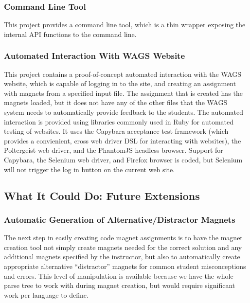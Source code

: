 \documentclass[letter,10pt]{article}
\begin{document}
\subsubsection{Command Line Tool}

This project provides a command line tool, which is a thin wrapper 
exposing the internal API functions to the command line.


\subsubsection{Automated Interaction With WAGS Website}

This project contains a proof-of-concept automated interaction with the 
WAGS website, which is capable of logging in to the site, and creating 
an assignment with magnets from a specified input file. The assignment 
that is created has the magnets loaded, but it does not have any of the 
other files that the WAGS system needs to automatically provide 
feedback to the students. The automated interaction is provided using 
libraries commonly used in Ruby for automated testing of websites. It 
uses the Capybara acceptance test framework (which provides a 
convienient, cross web driver DSL for interacting with websites), the 
Poltergeist web driver, and the PhantomJS headless browser. Support for 
Capybara, the Selenium web driver, and Firefox browser is coded, but 
Selenium will not trigger the log in button on the current web site.


\subsection{What It Could Do: Future Extensions}

\subsubsection{Automatic Generation of Alternative/Distractor Magnets}

The next step in easily creating code magnet assignments is to have the 
magnet creation tool not simply create magnets needed for the correct 
solution and any additional magnets specified by the instructor, but 
also to automatically create appropriate alternative ``distractor'' 
magnets for common student misconceptions and errors. This level of 
manipulation is available because we have the whole parse tree to work 
with during magnet creation, but would require significant work per 
language to define.
\end{document}
